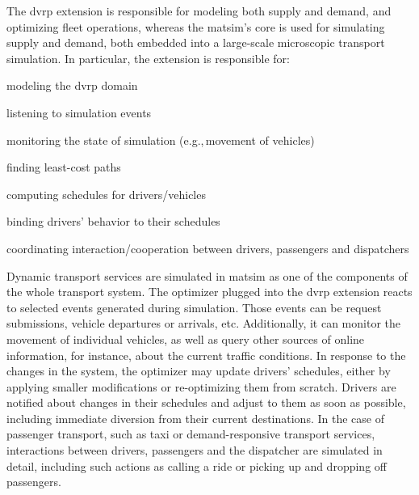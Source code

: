 The \gls{dvrp} extension is responsible for modeling both supply and demand, and optimizing fleet operations, whereas the \gls{matsim}'s core is used for simulating supply and demand, both embedded into a large-scale microscopic transport simulation. In particular, the extension is responsible for:
%
\begin{compactitem}
	\item modeling the \gls{dvrp} domain
	\item listening to simulation events
	\item monitoring the state of simulation (e.g.,\,movement of vehicles)
	\item finding least-cost paths
	\item computing schedules for drivers/vehicles
	\item binding drivers' behavior to their schedules
	\item coordinating interaction/cooperation between drivers, passengers and dispatchers
\end{compactitem}

Dynamic transport services are simulated in \gls{matsim} as one of the components of the whole transport system. The optimizer plugged into the \gls{dvrp} extension reacts to selected events generated during simulation. Those events can be request submissions, vehicle departures or arrivals, etc. Additionally, it can monitor the movement of individual vehicles, as well as query other sources of online information, for instance, about the current traffic conditions. In response to the changes in the system, the optimizer may update drivers' schedules, either by applying smaller modifications or re-optimizing them from scratch. Drivers are notified about changes in their schedules and adjust to them as soon as possible, including immediate diversion from their current destinations. In the case of passenger transport, such as taxi or demand-responsive transport services, interactions between drivers, passengers and the dispatcher are simulated in detail, including such actions as calling a ride or picking up and dropping off passengers.

